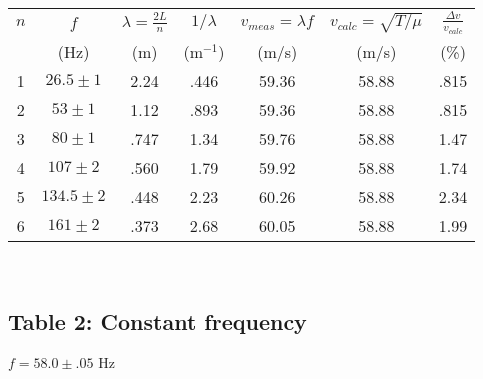\documentclass{article}
\begin{document}
\begin{center}
\begin{tabular}{ |c|c||c|c|c|c|c| }
    \hline
    $n$ & $f$ & $\lambda=\frac{2L}{n}$ & $1/\lambda$ & $v_{meas}=\lambda f$ & $v_{calc}=\sqrt{T/\mu}$ & $\frac{\Delta v}{v_{calc}}$ \\
    & (Hz) & (m) & (m$^{-1}$) & (m/s) & (m/s) & (\%) \\
    \hline
    1 & $26.5\pm1$ & 2.24 & .446 & 59.36 & 58.88 & .815 \\
    \hline
    2 & $53\pm1$ & 1.12 & .893 & 59.36 & 58.88 & .815 \\
    \hline
    3 & $80\pm1$ & .747 & 1.34 & 59.76 & 58.88 & 1.47 \\
    \hline
    4 & $107\pm2$ & .560 & 1.79 & 59.92 & 58.88 & 1.74 \\
    \hline
    5 & $134.5\pm2$ & .448 & 2.23 & 60.26 & 58.88 & 2.34 \\
    \hline
    6 & $161\pm2$ & .373 & 2.68 & 60.05 & 58.88 & 1.99 \\
    \hline
\end{tabular}
\end{center}

 \\


\subsection{Table 2: Constant frequency}

$f = 58.0 \pm .05$ Hz
\end{document}

